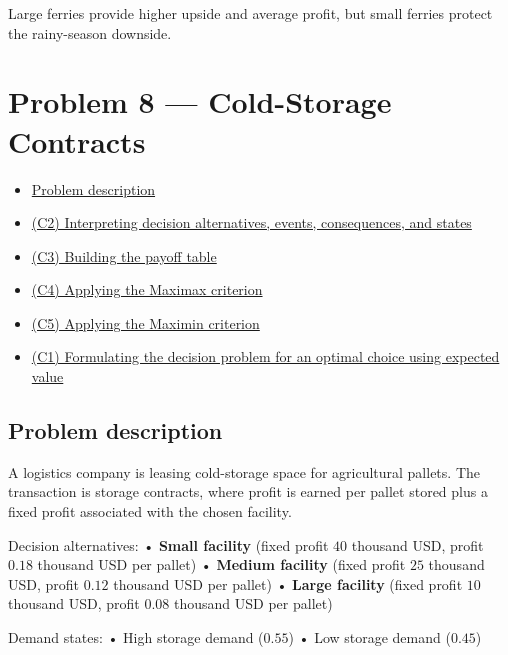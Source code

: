 \documentclass[11pt]{article}
\begin{document}
	Large ferries provide higher upside and average profit, but small ferries protect the rainy-season downside.
	
	\section*{Problem 8 — Cold-Storage Contracts}
	
	\hypertarget{problem8}{}
	
	\hypertarget{problem8-criteria}{}
	
	\begin{itemize}
		\item \hyperlink{problem8-problem}{Problem description}
		\item \hyperlink{problem8-c2}{(C2) Interpreting decision alternatives, events, consequences, and states}
		\item \hyperlink{problem8-c3}{(C3) Building the payoff table}
		\item \hyperlink{problem8-c4}{(C4) Applying the Maximax criterion}
		\item \hyperlink{problem8-c5}{(C5) Applying the Maximin criterion}
		\item \hyperlink{problem8-c1}{(C1) Formulating the decision problem for an optimal choice using expected value}
	\end{itemize}
	
	
	\subsection*{Problem description}
	
	\hypertarget{problem8-problem}{}
	
	A logistics company is leasing cold-storage space for agricultural pallets. The transaction is storage contracts,
	where profit is earned per pallet stored plus a fixed profit associated with the chosen facility.
	
	
	
	
	
	
	Decision alternatives:
	• \textbf{Small facility} (fixed profit $40$ thousand USD, profit $0.18$ thousand USD per pallet)
	• \textbf{Medium facility} (fixed profit $25$ thousand USD, profit $0.12$ thousand USD per pallet)
	• \textbf{Large facility} (fixed profit $10$ thousand USD, profit $0.08$ thousand USD per pallet)
	
	
	
	
	
	
	Demand states:
	• High storage demand ($0.55$)
	• Low storage demand ($0.45$)
	
\end{document}
